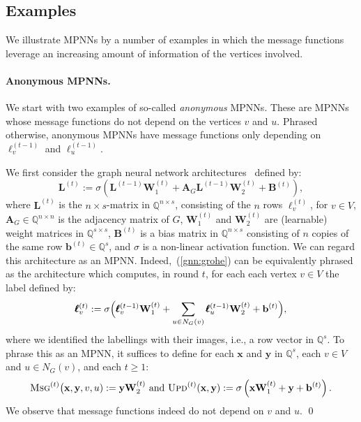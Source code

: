 \subsection{Examples}
We illustrate MPNNs by a number of examples in which the message functions leverage an increasing amount of information of the vertices involved. 

\paragraph{Anonymous MPNNs.}
We start with two examples of so-called \textit{anonymous}  MPNNs. These are MPNNs whose message functions do not depend on the vertices $v$ and $u$. Phrased otherwise, anonymous MPNNs have message functions only depending on $\pmb{\ell}_v^{(t-1)}$ and $\pmb{\ell}_u^{(t-1)}$.
\begin{example}\label{ex:GNN}\normalfont
We first consider
the graph neural network
architectures~\cite{Hamilton2017a,grohewl} defined by:
\begin{equation}
\mathbf{L}^{(t)}:=\sigma\left(\mathbf{L}^{(t-1)}\mathbf{W}_1^{(t)}+\mathbf{A}_G\mathbf{L}^{(t-1)}\mathbf{W}_2^{(t)}+\mathbf{B}^{(t)}\right), \label{gnn:grohe}
\end{equation}
where $\mathbf{L}^{(t)}$ is the $n\times s$-matrix in $\mathbb{Q}^{n\times s}$, consisting of the $n$ rows $\pmb{\ell}^{(t)}_v$, for $v\in V$, $\mathbf{A}_G\in\mathbb{Q}^{n\times n}$ is the adjacency matrix of $G$, $\mathbf{W}_1^{(t)}$ and $\mathbf{W}_2^{(t)}$ are (learnable) weight matrices in $\mathbb{Q}^{s\times s}$,
$\mathbf{B}^{(t)}$ is a bias matrix in $\mathbb{Q}^{n\times s}$ consisting of $n$ copies of the same row $\mathbf{b}^{(t)}\in \mathbb{Q}^s$, and $\sigma$ is a non-linear activation function. We can regard this architecture as an MPNN. Indeed,~(\ref{gnn:grohe}) can be equivalently phrased as the architecture which computes, in round $t$, for each each vertex $v\in V$ the label defined by:
$$
\pmb{\ell}^{(t)}_v:=\sigma\Bigl(\pmb{\ell}^{(t-1)}_v\mathbf{W}_1^{(t)}+ \sum_{u\in N_G(v)}\pmb{\ell}^{(t-1)}_u\mathbf{W}_2^{(t)}+\mathbf{b}^{(t)} \Bigr),
$$
where we identified the labellings with their images, i.e., a row vector in $\mathbb{Q}^s$. 
To phrase this as an MPNN, it suffices to define for each $\mathbf{x}$ and $\mathbf{y}$ in $\mathbb{Q}^s$, each $v\in V$ and $u\in N_G(v)$, and each $t\geq 1$:
\begin{equation*}
	\textsc{Msg}^{(t)}\bigl(\mathbf{x},\mathbf{y},v,u):=\mathbf{y}\mathbf{W}_2^{(t)}
\text{ and } 
\textsc{Upd}^{(t)}(\mathbf{x},\mathbf{y}):=\sigma\left(\mathbf{x}\mathbf{W}_1^{(t)}+\mathbf{y} + \mathbf{b}^{(t)}\right).
\end{equation*} 
We observe that  message functions indeed do not depend on $v$ and $u$. \qed
\end{example}
